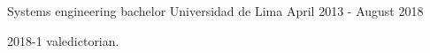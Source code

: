

\begin{cventries}

  \cventry
    {Systems engineering bachelor} %
    {Universidad de Lima} %
    {} %
    {April 2013 - August 2018} %
    {
      \begin{cvitems} %
        \item {2018-1 valedictorian.}
      \end{cvitems}
    }

\end{cventries}
